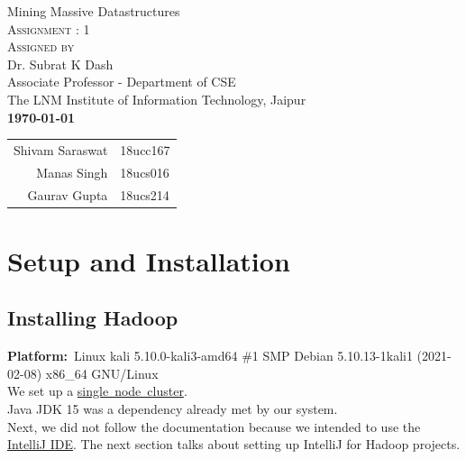 \documentclass[10pt]{report}
\begin{document}
\begin{titlepage}
\begin{center}
        \pagebreak

        \hspace{0pt}
        \vfill
        {\fontsize{32pt}{10pt}\selectfont Mining Massive Datastructures}\\
        \vspace{2cm}
        {\fontsize{23pt}{2pt}\selectfont \textsc{Assignment : 1}}\\
        
        \vspace{3cm}
        \textsc{\Large Assigned by} \\

        {\large Dr. Subrat K Dash \\
        Associate Professor - Department of CSE \\
        \vspace{0.3cm}
        The LNM Institute of Information Technology, Jaipur} \\
        \vspace{0.7cm}
        \textbf{\today}


        \vspace*{\fill}

        {\fontsize{11pt}{10pt}\selectfont
        \begin{tabular}{rl}
                Shivam Saraswat & 18ucc167 \\
                Manas Singh & 18ucs016 \\
                Gaurav Gupta & 18ucs214
        \end{tabular}}

\end{center}
\end{titlepage}
\tableofcontents
\clearpage
{}
\setlength{\parindent}{0pt}
\section{Setup and Installation}
\subsection{Installing Hadoop}
\textbf{Platform:}~{Linux kali 5.10.0-kali3-amd64 \#1 SMP Debian 5.10.13-1kali1 (2021-02-08) x86\_64 GNU/Linux}\\

We set up a \href{https://hadoop.apache.org/docs/stable/hadoop-project-dist/hadoop-common/SingleCluster.html}{single~node~cluster}.\\
Java JDK 15 was a dependency already met by our system.\\
Next, we did not follow the documentation because we intended to use the \href{https://intellij.org}{IntelliJ IDE}. The next section talks about setting up IntelliJ for Hadoop projects.
\
\end{document}
